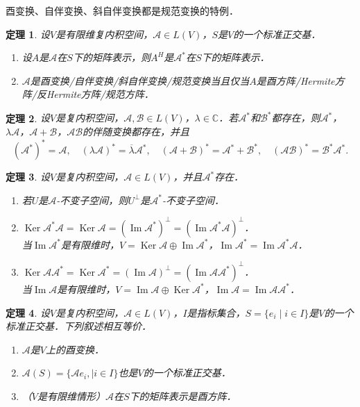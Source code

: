 \documentclass[a4paper,fontset=windows]{ctexbook}
\newtheorem{theorem}{定理}[chapter]
\theoremstyle{definition}
\DeclareMathOperator{\im}{Im}
\DeclareMathOperator{\Ker}{Ker}
\begin{document}
酉变换、自伴变换、斜自伴变换都是规范变换的特例．

\begin{theorem}
设$V$是有限维复内积空间，$\mathcal{A}\in L(V)$，$S$是$V$的一个标准正交基．
\begin{enumerate}
\item 设$A$是$\mathcal{A}$在$S$下的矩阵表示，则$A^H$是$\mathcal{A}^*$在$S$下的矩阵表示．

\item $\mathcal{A}$是酉变换/自伴变换/斜自伴变换/规范变换当且仅当$A$是酉方阵/Hermite方阵/反Hermite方阵/规范方阵．
\end{enumerate}
\end{theorem}

\begin{theorem}
设$V$是复内积空间，$\mathcal{A},\mathcal{B}\in L(V)$，$\lambda\in\mathbb{C}$．若$\mathcal{A}^*$和$\mathcal{B}^*$都存在，则$\mathcal{A}^*$，$\lambda\mathcal{A}$，$\mathcal{A+B}$，$\mathcal{AB}$的伴随变换都存在，并且
$$(\mathcal{A}^*)^*=\mathcal{A},\quad(\lambda\mathcal{A})^*=\overline{\lambda}\mathcal{A}^*,\quad(\mathcal{A+B})^*=\mathcal{A}^*+\mathcal{B}^*,\quad(\mathcal{AB})^*=\mathcal{B}^*\mathcal{A}^*.$$
\end{theorem}

\begin{theorem}
设$V$是复内积空间，$\mathcal{A}\in L(V)$，并且$\mathcal{A}^*$存在．
\begin{enumerate}
\item 若$U$是$\mathcal{A}$-不变子空间，则$U^\perp$是$\mathcal{A}^*$-不变子空间．

\item $\Ker\mathcal{A}^*\mathcal{A}=\Ker\mathcal{A}=(\im\mathcal{A}^*)^\perp=(\im\mathcal{A^*A})^\perp$．\\ 当$\im\mathcal{A}^*$是有限维时，$V=\Ker\mathcal{A}\oplus\im\mathcal{A}^*$，$\im\mathcal{A}^*=\im\mathcal{A}^*\mathcal{A}$．

\item $\Ker\mathcal{AA^*}=\Ker\mathcal{A}^*=(\im\mathcal{A})^\perp=(\im\mathcal{AA^*})^\perp$．\\ 当$\im\mathcal{A}$是有限维时，$V=\im\mathcal{A}\oplus\Ker\mathcal{A}^*$，$\im\mathcal{A}=\im\mathcal{A}\mathcal{A}^*$．
\end{enumerate}
\end{theorem}

\begin{theorem}
设$V$是复内积空间，$\mathcal{A}\in L(V)$，$I$是指标集合，$S=\{e_i\mid i\in I\}$是$V$的一个标准正交基．下列叙述相互等价．
\begin{enumerate}
\item $\mathcal{A}$是$V$上的酉变换．

\item $\mathcal{A}(S)=\{\mathcal{A}e_i,\mid i\in I\}$也是$V$的一个标准正交基．

\item（$V$是有限维情形）$\mathcal{A}$在$S$下的矩阵表示是酉方阵．
\end{enumerate}
\end{theorem}
\end{document}
